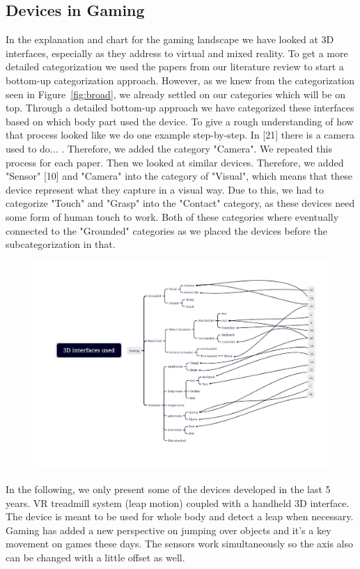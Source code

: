 \subsection{Devices in Gaming}
\label{gaming}
In the explanation and chart for the gaming landscape we have looked at 3D interfaces, especially as they address to virtual and mixed reality. To get a more detailed categorization we used the papers from our literature review to start a bottom-up categorization approach. However, as we knew from the categorization seen in Figure~\ref{fig:broad}, we already settled on our categories which will be on top. Through a detailed bottom-up approach we have categorized these interfaces based on which body part used the device. To give a rough understanding of how that process looked like we do one example step-by-step. In [21] there is a camera used to do... . Therefore, we added the category "Camera". We repeated this process for each paper. Then we looked at similar devices. Therefore, we added "Sensor" [10] and "Camera" into the category of "Visual", which means that these device represent what they capture in a visual way. Due to this, we had to categorize "Touch" and "Grasp" into the "Contact" category, as these devices need some form of human touch to work. Both of these categories where eventually connected to the "Grounded" categories as we placed the devices before the subcategorization in that.


\begin{figure}[htbp]
	\includegraphics[width=\columnwidth]{figures/gaming.pdf}
	\label{fig:gaming}
\end{figure}
 

In the following, we only present some of the devices developed in the last 5 years. 
VR treadmill system (leap motion) coupled with a handheld 3D interface. The device is meant to be used for whole body and detect a leap when necessary. Gaming has added a new perspective on jumping over objects and it's a key movement on games these days. The sensors work simultaneously so the axis also can be changed with a little offset as well.

